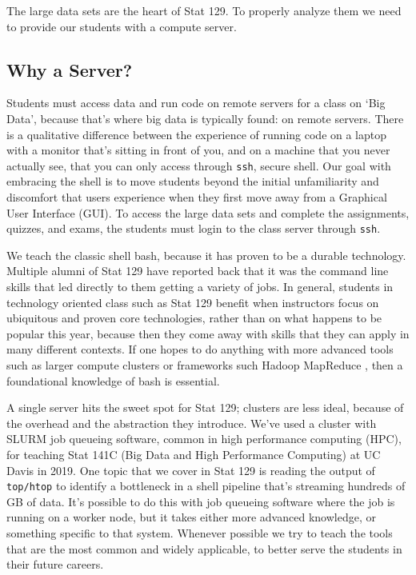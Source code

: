 \documentclass[12pt]{article}
\begin{document}
The large data sets are the heart of Stat 129.
To properly analyze them we need to provide our students with a compute server.


\subsection{Why a Server?}

Students must access data and run code on remote servers for a class on `Big Data', because that's where big data is typically found: on remote servers.
There is a qualitative difference between the experience of running code on a laptop with a monitor that's sitting in front of you, and on a machine that you never actually see, that you can only access through \texttt{ssh}, secure shell.
Our goal with embracing the shell is to move students beyond the initial unfamiliarity and discomfort that users experience when they first move away from a Graphical User Interface (GUI).
To access the large data sets and complete the assignments, quizzes, and exams, the students must login to the class server through \texttt{ssh}.

We teach the classic shell bash, because it has proven to be a durable technology.
Multiple alumni of Stat 129 have reported back that it was the command line skills that led directly to them getting a variety of jobs.
In general, students in technology oriented class such as Stat 129 benefit when instructors focus on ubiquitous and proven core technologies, rather than on what happens to be popular this year, because then they come away with skills that they can apply in many different contexts.
If one hopes to do anything with more advanced tools such as larger compute clusters or frameworks such Hadoop MapReduce \cite{white2012hadoop}, then a foundational knowledge of bash is essential.

A single server hits the sweet spot for Stat 129; clusters are less ideal, because of the overhead and the abstraction they introduce.
We've used a cluster with SLURM \cite{yoo2003slurm} job queueing software, common in high performance computing (HPC), for teaching Stat 141C (Big Data and High Performance Computing) at UC Davis in 2019.
One topic that we cover in Stat 129 is reading the output of \texttt{top/htop} to identify a bottleneck in a shell pipeline that's streaming hundreds of GB of data.
It's possible to do this with job queueing software where the job is running on a worker node, but it takes either more advanced knowledge, or something specific to that system.
Whenever possible we try to teach the tools that are the most common and widely applicable, to better serve the students in their future careers.
\end{document}
